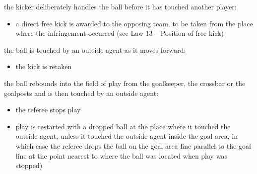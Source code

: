 {\bigskip

the kicker deliberately handles the ball before it has touched another
player:

\begin{itemize}
\item a direct free kick is awarded to the opposing team, to be taken from the
place where the infringement occurred (see Law 13 -- Position of free
kick)
\end{itemize}

\bigskip

the ball is touched by an outside agent as it moves forward:

\begin{itemize}
\item the kick is retaken
\end{itemize}

\bigskip

the ball rebounds into the field of play from the goalkeeper, the
crossbar or the goalposts and is then touched by an outside agent:

\begin{itemize}
\item the referee stops play
\item play is restarted with a dropped ball at the place where it touched the
outside agent, unless it touched the outside agent inside the goal area,
in which case the referee drops the ball on the goal area line parallel
to the goal line at the point nearest to where the ball was located
when play was stopped)
\end{itemize}
}
\color{black}